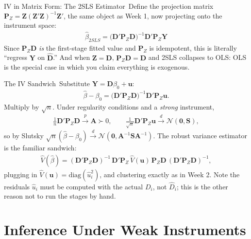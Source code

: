 \documentclass[aspectratio=169,11pt,xcolor=dvipsnames]{beamer}
\newcommand{\zero}{\bm{0}}
\newcommand{\dto}{\overset{d}{\longrightarrow}}
\newcommand{\pto}{\overset{p}{\longrightarrow}}
\newcommand{\adv}{\,\raisebox{0.6pt}{\textcolor{accent}{$\bigstar$}}}
\begin{document}
\begin{frame}{IV in Matrix Form: The 2SLS Estimator\adv}
Define the projection matrix $\bm P_Z = \bm Z(\bm Z'\bm Z)^{-1}\bm Z'$, the
same object as Week 1, now projecting onto the instrument space:
\begin{align*}
  \boxed{\;\hat\beta_{2SLS} = \big(\bm D'\bm P_Z \bm D\big)^{-1}\bm D'\bm P_Z\bm Y\;}
\end{align*}
Since $\bm P_Z\bm D$ \emph{is} the first-stage fitted value and $\bm P_Z$ is
idempotent, this is literally ``regress $\bm Y$ on $\hat{\bm D}$.'' And when
$\bm Z = \bm D$, $\bm P_Z\bm D = \bm D$ and 2SLS collapses to OLS: \alert{OLS is
the special case in which you claim everything is exogenous}.
\end{frame}

\begin{frame}{The IV Sandwich\adv}
Substitute $\bm Y = \bm D\beta_0 + \bm u$:
\begin{align*}
  \hat\beta - \beta_0 = \big(\bm D'\bm P_Z\bm D\big)^{-1}\bm D'\bm P_Z \bm u .
\end{align*}
Multiply by $\sqrt n$. Under regularity conditions and a \emph{strong}
instrument,
\begin{align*}
  \tfrac1n \bm D'\bm P_Z\bm D \pto \bm A \succ 0,
  \qquad
  \tfrac{1}{\sqrt n}\bm D'\bm P_Z\bm u \dto \mathcal N(\zero, \bm S) ,
\end{align*}
so by Slutsky $\sqrt n(\hat\beta-\beta_0)\dto \mathcal N(\zero, \bm A^{-1}\bm S\bm A^{-1})$.
\vskip3pt
The robust variance estimator is the familiar sandwich:
\begin{align*}
  \hat{V}(\hat\beta)
  = (\bm D'\bm P_Z\bm D)^{-1}\,\bm D'\bm P_Z\,
    \hat{V}(\bm u)\,\bm P_Z\bm D\,(\bm D'\bm P_Z\bm D)^{-1} ,
\end{align*}
plugging in $\hat{V}(\bm u) = \mathrm{diag}(\hat u_i^2)$, and clustering
exactly as in Week 2. \alert{Note the residuals $\hat u_i$ must be computed with
the actual $D_i$, not $\hat D_i$}; this is the other reason not to run the stages
by hand.
\end{frame}

\section[Weak IV]{Inference Under Weak Instruments}
\begin{frame}\sectionpage\end{frame}
\end{document}
